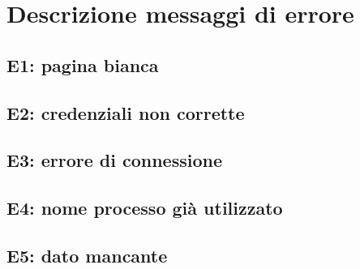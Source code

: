 \section{Descrizione messaggi di errore}
\label{errori}

\subsection{E1: pagina bianca}
\label{e1}

\subsection{E2: credenziali non corrette}
\label{e2}

\subsection{E3: errore di connessione}
\label{e3}

\subsection{E4: nome processo già utilizzato}
\label{e4}

\subsection{E5: dato mancante}
\label{e5}